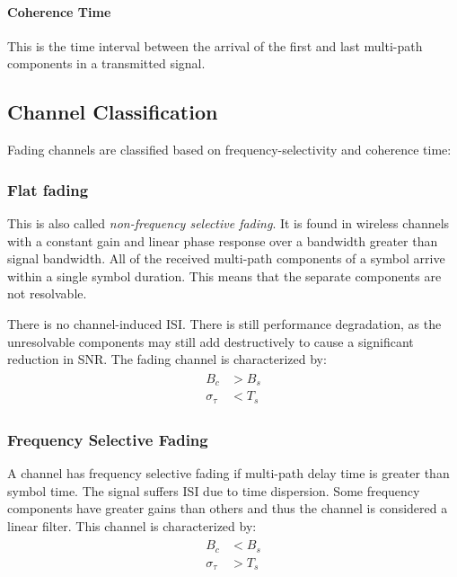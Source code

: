 \paragraph{Coherence Time}
This is the time interval between the arrival of the first and last multi-path components in a transmitted signal\cite{Hindu}.

\subsection{Channel Classification}
Fading channels are classified based on frequency-selectivity and coherence time:
\subsubsection{Flat fading}
This is also called \emph{non-frequency selective fading}. It is found in wireless channels with a constant gain and linear phase response over a bandwidth greater than signal bandwidth\cite{fuqin}. All of the received multi-path components of a symbol arrive within a single symbol duration. This means that the separate components are not resolvable.

There is no channel-induced \gls{ISI}. There is still performance degradation, as the unresolvable components may still add destructively to cause a significant reduction in \gls{SNR}. The fading channel is characterized by:
\begin{align}
	\begin{split}
		B_c &> B_s \\
		\sigma_\tau &< T_s
	\end{split}
\end{align}
\begin{mathDef}
\end{mathDef}
\subsubsection{Frequency Selective Fading}
A channel has frequency selective fading if multi-path delay time is greater than symbol time. The signal suffers \gls{ISI} due to time dispersion. Some frequency components have greater gains than others and thus the channel is considered a linear filter\cite{fuqin}. This channel is characterized by:
\begin{align}
	\begin{split}
	B_c &< B_s \\
	\sigma_\tau &> T_s
	\end{split}
\end{align}

